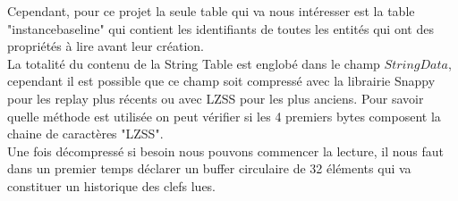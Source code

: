\documentclass{article}
\begin{document}
Cependant, pour ce projet la seule table qui va nous intéresser est la table "instancebaseline" qui contient les identifiants de toutes les entités qui ont des propriétés à lire avant leur création.\\

La totalité du contenu de la String Table est englobé dans le champ $StringData$, cependant il est possible que ce champ soit compressé avec la librairie Snappy pour les replay plus récents ou avec LZSS pour les plus anciens. Pour savoir quelle méthode est utilisée on peut vérifier si les 4 premiers bytes composent la chaine de caractères "LZSS".\\
Une fois décompressé si besoin nous pouvons commencer la lecture, il nous faut dans un premier temps déclarer un buffer circulaire de 32 éléments qui va constituer un historique des clefs lues.\\
\end{document}
